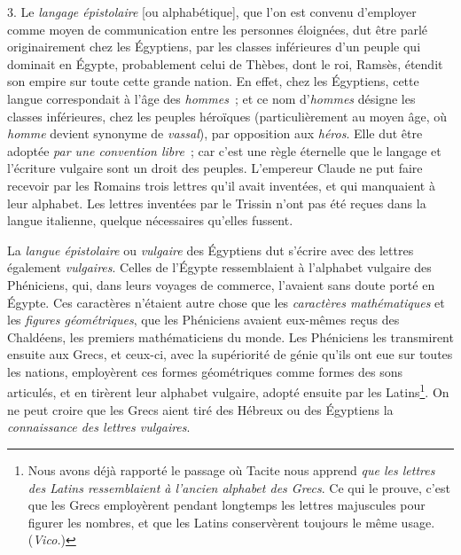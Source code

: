 \documentclass[french,twoside]{book} %
\begin{document}
3. Le {\itshape langage épistolaire} [ou alphabétique], que l’on est convenu d’employer comme moyen de communication entre les personnes éloignées, dut être parlé originairement chez les Égyptiens, par les classes inférieures d’un peuple qui dominait en Égypte, probablement celui de Thèbes, dont le roi, Ramsès, étendit son empire sur toute cette grande nation. En effet, chez les Égyptiens, cette langue correspondait à l’âge des {\itshape hommes} ; et ce nom d’{\itshape hommes} désigne les classes inférieures, chez les peuples héroïques  (particulièrement au moyen âge, où {\itshape homme} devient synonyme de {\itshape vassal}), par opposition aux {\itshape héros}. Elle dut être adoptée {\itshape par une convention libre} ; car c’est une règle éternelle que le langage et l’écriture vulgaire sont un droit des peuples. L’empereur Claude ne put faire recevoir par les Romains trois lettres qu’il avait inventées, et qui manquaient à leur alphabet. Les lettres inventées par le Trissin n’ont pas été reçues dans la langue italienne, quelque nécessaires qu’elles fussent.\par
La {\itshape langue épistolaire} ou {\itshape vulgaire} des Égyptiens dut s’écrire avec des lettres également {\itshape vulgaires}. Celles de l’Égypte ressemblaient à l’alphabet vulgaire des Phéniciens, qui, dans leurs voyages de commerce, l’avaient sans doute porté en Égypte. Ces caractères n’étaient autre chose que les {\itshape caractères mathématiques} et les {\itshape figures géométriques}, que les Phéniciens avaient eux-mêmes reçus des Chaldéens, les premiers mathématiciens du monde. Les Phéniciens les transmirent ensuite aux Grecs, et ceux-ci, avec la supériorité de génie qu’ils ont eue sur toutes les nations, employèrent ces formes géométriques comme formes des sons articulés, et en tirèrent leur alphabet vulgaire, adopté ensuite par les Latins\footnote{Nous avons déjà rapporté le passage où Tacite nous apprend \emph{{\itshape que les lettres des Latins ressemblaient à l’ancien alphabet des Grecs}}. Ce qui le prouve, c’est que les Grecs employèrent pendant longtemps les lettres majuscules pour figurer les nombres, et que les Latins conservèrent toujours le même usage. ({\itshape Vico.})}. On ne peut croire que les Grecs aient  tiré des Hébreux ou des Égyptiens la {\itshape connaissance des lettres vulgaires}.\par
\par
\end{document}
